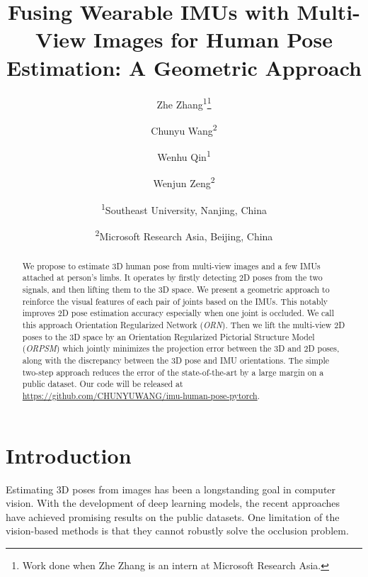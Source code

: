 \documentclass[10pt,twocolumn,letterpaper]{article}
\begin{document}
\title{Fusing Wearable IMUs with Multi-View Images for Human Pose Estimation: A Geometric Approach}
\author{Zhe Zhang\textsuperscript{1}\thanks{Work done when Zhe Zhang is an intern at Microsoft Research Asia.}\\
\and
Chunyu Wang\textsuperscript{2}\\
\and
Wenhu Qin\textsuperscript{1}\\
\and
Wenjun Zeng\textsuperscript{2}\\
\and
\textsuperscript{1}Southeast University, Nanjing, China
\and
\textsuperscript{2}Microsoft Research Asia, Beijing, China
}

\maketitle



\begin{abstract}
We propose to estimate $3$D human pose from multi-view images and a few IMUs attached at person's limbs. It operates by firstly detecting $2$D poses from the two signals, and then lifting them to the $3$D space. We present a geometric approach to reinforce the visual features of each pair of joints based on the IMUs. This notably improves $2$D pose estimation accuracy especially when one joint is occluded. We call this approach Orientation Regularized Network (\emph{ORN}).  Then we lift the multi-view $2$D poses to the $3$D space by an Orientation Regularized Pictorial Structure Model (\emph{ORPSM}) which jointly minimizes the projection error between the $3$D and $2$D poses, along with the discrepancy between the $3$D pose and IMU {orientations}. The simple two-step approach reduces the error of the state-of-the-art by a large margin on a public dataset. Our code will be released at \url{https://github.com/CHUNYUWANG/imu-human-pose-pytorch}.

\end{abstract}




\section{Introduction}

Estimating $3$D poses from images has been a longstanding goal in computer vision. With the development of deep learning models, the recent approaches \cite{gall2010optimization,PavlakosZDD17,belagiannis20143D,Rhodin_2018_ECCV,rhodin2018learning,trumble2018deep} have achieved promising results on the public datasets. One limitation of the vision-based methods is that they cannot robustly solve the occlusion problem. 
\end{document}
